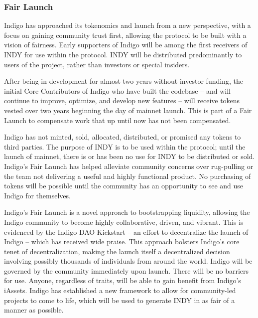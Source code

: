 \documentclass{article}
\begin{document}
\begin{sloppypar}
\filbreak

\hypertarget{fair-launch}{%
\subsubsection{Fair Launch}\label{fair-launch}}

Indigo has approached its tokenomics and launch from a new perspective,
with a focus on gaining community trust first, allowing the protocol to
be built with a vision of fairness. Early supporters of Indigo will be
among the first receivers of INDY for use within the protocol. INDY will
be distributed predominantly to users of the project, rather than
investors or special insiders.

After being in development for almost two years without investor
funding, the initial Core Contributors of Indigo who have built the
codebase -- and will continue to improve, optimize, and develop new
features -- will receive tokens vested over two years beginning the day
of mainnet launch. This is part of a Fair Launch to compensate work that
up until now has not been compensated.

Indigo has not minted, sold, allocated, distributed, or promised any
tokens to third parties. The purpose of INDY is to be used within the
protocol; until the launch of mainnet, there is or has been no use for
INDY to be distributed or sold. Indigo's Fair Launch has helped
alleviate community concerns over rug-pulling or the team not delivering
a useful and highly functional product. No purchasing of tokens will be
possible until the community has an opportunity to see and use Indigo
for themselves.

Indigo's Fair Launch is a novel approach to bootstrapping liquidity,
allowing the Indigo community to become highly collaborative, driven,
and vibrant. This is evidenced by the Indigo DAO Kickstart -- an effort
to decentralize the launch of Indigo -- which has received wide praise.
This approach bolsters Indigo's core tenet of decentralization, making
the launch itself a decentralized decision involving possibly thousands
of individuals from around the world. Indigo will be governed by the
community immediately upon launch. There will be no barriers for use.
Anyone, regardless of traits, will be able to gain benefit from Indigo's
iAssets. Indigo has established a new framework to allow for
community-led projects to come to life, which will be used to generate
INDY in as fair of a manner as possible.

\hypertarget{token-generation-event}{%
}
\end{sloppypar}
\end{document}
